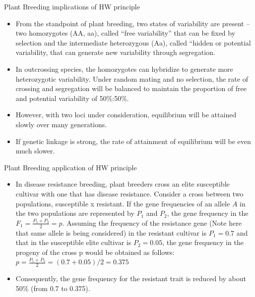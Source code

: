 \documentclass[11pt,ignorenonframetext,aspectratio=169]{beamer}
\providecommand{\tightlist}{%
  \setlength{\itemsep}{0pt}\setlength{\parskip}{0pt}}
\begin{document}
\begin{frame}{Plant Breeding implications of HW principle}
\protect\hypertarget{plant-breeding-implications-of-hw-principle}{}
\begin{itemize}
\tightlist
\item
  From the standpoint of plant breeding, two states of variability are
  present -- two homozygotes (AA, aa), called ``free variability'' that
  can be fixed by selection and the intermediate heterozygous (Aa),
  called ``hidden or potential variability, that can generate new
  variability through segregation.
\item
  In outcrossing species, the homozygotes can hybridize to generate more
  heterozygotic variability. Under random mating and no selection, the
  rate of crossing and segregation will be balanced to maintain the
  proportion of free and potential variability of 50\%:50\%.
\item
  However, with two loci under consideration, equilibrium will be
  attained slowly over many generations.
\item
  If genetic linkage is strong, the rate of attainment of equilibrium
  will be even much slower.
\end{itemize}
\end{frame}

\begin{frame}{Plant Breeding application of HW principle}
\protect\hypertarget{plant-breeding-application-of-hw-principle}{}
\begin{itemize}
\tightlist
\item
  In disease resistance breeding, plant breeders cross an elite
  susceptible cultivar with one that has disease resistance. Consider a
  cross between two populations, susceptible x resistant. If the gene
  frequencies of an allele \(A\) in the two populations are represented
  by \(P_1\) and \(P_2\), the gene frequency in the
  \(F_1 = \frac{P_1 + P_2}{2} = p\). Assuming the frequency of the
  resistance gene (Note here that same allele is being considered) in
  the resistant cultivar is \(P_1=0.7\) and that in the susceptible
  elite cultivar is \(P_2=0.05\), the gene frequency in the progeny of
  the cross p would be obtained as follows:
  \(p = \frac{P_1 + P_2}{2} = (0.7 + 0.05)/2 = 0.375\)
\item
  Consequently, the gene frequency for the resistant trait is reduced by
  about 50\% (from 0.7 to 0.375).
\end{itemize}
\end{frame}
\end{document}
